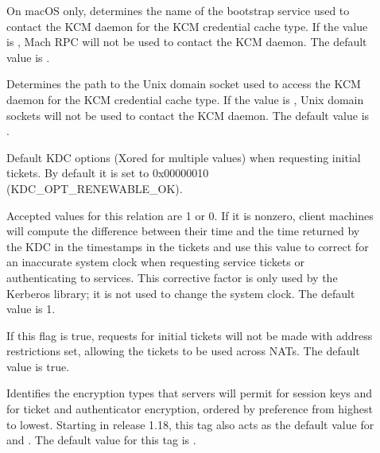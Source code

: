 \documentclass[letterpaper,10pt,english]{sphinxmanual}
\begin{document}
\begin{description}
\item[{}] \leavevmode
\sphinxAtStartPar
On macOS only, determines the name of the bootstrap service used to
contact the KCM daemon for the KCM credential cache type.  If the
value is \sphinxcode{\sphinxupquote{\sphinxhyphen{}}}, Mach RPC will not be used to contact the KCM
daemon.  The default value is .

\item[{}] \leavevmode
\sphinxAtStartPar
Determines the path to the Unix domain socket used to access the
KCM daemon for the KCM credential cache type.  If the value is
\sphinxcode{\sphinxupquote{\sphinxhyphen{}}}, Unix domain sockets will not be used to contact the KCM
daemon.  The default value is
.

\item[{}] \leavevmode
\sphinxAtStartPar
Default KDC options (Xored for multiple values) when requesting
initial tickets.  By default it is set to 0x00000010
(KDC\_OPT\_RENEWABLE\_OK).

\item[{}] \leavevmode
\sphinxAtStartPar
Accepted values for this relation are 1 or 0.  If it is nonzero,
client machines will compute the difference between their time and
the time returned by the KDC in the timestamps in the tickets and
use this value to correct for an inaccurate system clock when
requesting service tickets or authenticating to services.  This
corrective factor is only used by the Kerberos library; it is not
used to change the system clock.  The default value is 1.

\item[{}] \leavevmode
\sphinxAtStartPar
If this flag is true, requests for initial tickets will not be
made with address restrictions set, allowing the tickets to be
used across NATs.  The default value is true.

\item[{}] \leavevmode
\sphinxAtStartPar
Identifies the encryption types that servers will permit for
session keys and for ticket and authenticator encryption, ordered
by preference from highest to lowest.  Starting in release 1.18,
this tag also acts as the default value for
 and .  The
default value for this tag is .


\end{description}
\end{document}
